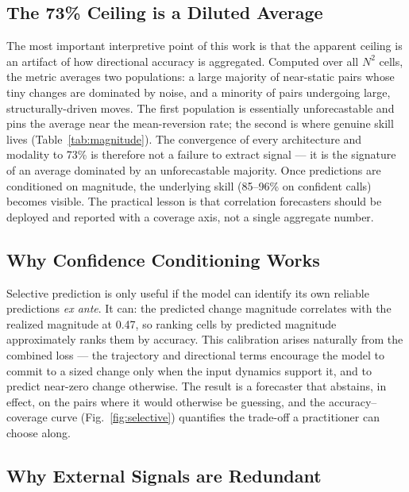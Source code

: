 \documentclass[runningheads]{llncs}
\begin{document}
\subsection{The 73\% Ceiling is a Diluted Average}

The most important interpretive point of this work is that the
apparent ceiling is an artifact of how directional accuracy is
aggregated. Computed over all $N^2$ cells, the metric averages two
populations: a large majority of near-static pairs whose tiny changes
are dominated by noise, and a minority of pairs undergoing large,
structurally-driven moves. The first population is essentially
unforecastable and pins the average near the mean-reversion rate; the
second is where genuine skill lives (Table~\ref{tab:magnitude}). The
convergence of every architecture and modality to 73\% is therefore not
a failure to extract signal --- it is the signature of an average
dominated by an unforecastable majority. Once predictions are
conditioned on magnitude, the underlying skill (85--96\% on confident
calls) becomes visible. The practical lesson is that correlation
forecasters should be deployed and reported with a coverage axis, not a
single aggregate number.

\subsection{Why Confidence Conditioning Works}

Selective prediction is only useful if the model can identify its own
reliable predictions \emph{ex ante}. It can: the predicted change
magnitude correlates with the realized magnitude at 0.47, so ranking
cells by predicted magnitude approximately ranks them by accuracy. This
calibration arises naturally from the combined loss --- the trajectory
and directional terms encourage the model to commit to a sized change
only when the input dynamics support it, and to predict near-zero change
otherwise. The result is a forecaster that abstains, in effect, on the
pairs where it would otherwise be guessing, and the accuracy--coverage
curve (Fig.~\ref{fig:selective}) quantifies the trade-off a practitioner
can choose along.

\subsection{Why External Signals are Redundant}
\end{document}

